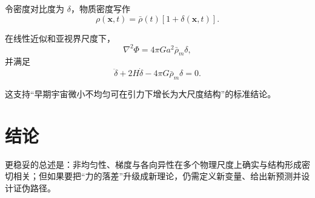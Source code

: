 \documentclass[12pt,a4paper]{ctexart}
\begin{document}
令密度对比度为 $\delta$，物质密度写作
\begin{equation}
\rho(\bm{x},t)=\bar{\rho}(t)[1+\delta(\bm{x},t)].
\end{equation}

在线性近似和亚视界尺度下，
\begin{equation}
\nabla^2\Phi=4\pi G a^2\bar{\rho}_m\delta,
\end{equation}
并满足
\begin{equation}
\ddot{\delta}+2H\dot{\delta}-4\pi G\bar{\rho}_m\delta=0.
\end{equation}

这支持“早期宇宙微小不均匀可在引力下增长为大尺度结构”的标准结论。

\section{结论}

更稳妥的总述是：非均匀性、梯度与各向异性在多个物理尺度上确实与结构形成密切相关；但如果要把“力的落差”升级成新理论，仍需定义新变量、给出新预测并设计证伪路径。
\end{document}
